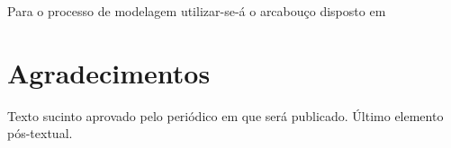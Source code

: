 \documentclass[
	article,			%
	11pt,				%
	oneside,			%
	a4paper,			%
	english,			%
	brazil,				%
	sumario=tradicional	
	]{abntex2}
\begin{document}
Para o processo de modelagem utilizar-se-á o arcabouço disposto em \cite{baraka2020}

\postextual




\section*{Agradecimentos}
Texto sucinto aprovado pelo periódico em que será publicado. Último 
elemento pós-textual.
\end{document}
